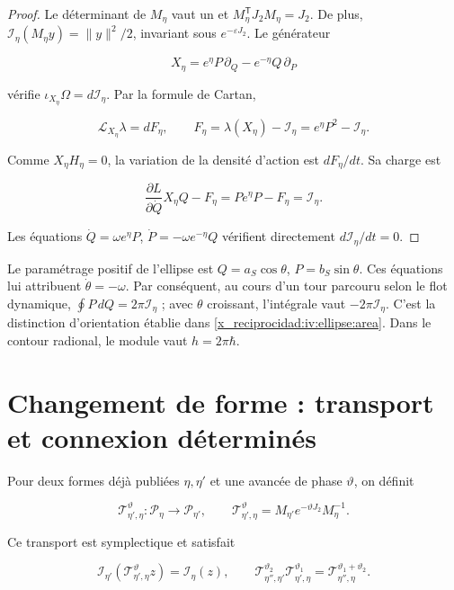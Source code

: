 \begin{proof}
Le déterminant de \(M_\eta\) vaut un et \(M_\eta^{\mathsf T}J_2M_\eta=J_2\). De plus,
\(\mathcal I_\eta(M_\eta y)=\|y\|^2/2\), invariant sous \(e^{-\varepsilon J_2}\).
Le générateur

\[
X_\eta=e^\eta P\,\partial_Q-e^{-\eta}Q\,\partial_P
\]

vérifie \(\iota_{X_\eta}\Omega=d\mathcal I_\eta\). Par la formule de Cartan,

\[
\mathcal L_{X_\eta}\lambda=dF_\eta,\qquad
F_\eta=\lambda(X_\eta)-\mathcal I_\eta=e^\eta P^2-\mathcal I_\eta.
\]

Comme \(X_\eta H_\eta=0\), la variation de la densité d’action est \(dF_\eta/dt\). Sa charge est

\[
\frac{\partial L}{\partial\dot Q}X_\eta Q-F_\eta
=Pe^\eta P-F_\eta=\mathcal I_\eta.
\]

Les équations \(\dot Q=\omega e^\eta P\), \(\dot P=-\omega e^{-\eta}Q\) vérifient directement \(d\mathcal I_\eta/dt=0\).
\end{proof}

Le paramétrage positif de l’ellipse est \(Q=a_S\cos\theta\), \(P=b_S\sin\theta\). Ces équations lui attribuent \(\dot\theta=-\omega\). Par conséquent, au cours d’un tour parcouru selon le flot dynamique, \(\oint P\,dQ=2\pi\mathcal I_\eta\) ; avec \(\theta\) croissant, l’intégrale vaut \(-2\pi\mathcal I_\eta\). C’est la distinction d’orientation établie dans \cref{x_reciprocidad:iv:ellipse:area}. Dans le contour radional, le module vaut \(h=2\pi\hbar\).

\section{Changement de forme : transport et connexion déterminés}

Pour deux formes déjà publiées \(\eta,\eta'\) et une avancée de phase \(\vartheta\), on définit

\begin{equation}
\mathcal T_{\eta',\eta}^{\vartheta}:\mathcal P_\eta\to\mathcal P_{\eta'},
\qquad
\mathcal T_{\eta',\eta}^{\vartheta}
=M_{\eta'}e^{-\vartheta J_2}M_\eta^{-1}.
\label{x_reciprocidad:nuc07:eq:4}
\end{equation}

\begin{proposition}
Ce transport est symplectique et satisfait

\begin{equation}
\mathcal I_{\eta'}(\mathcal T_{\eta',\eta}^{\vartheta}z)
=\mathcal I_\eta(z),\qquad
\mathcal T_{\eta'',\eta'}^{\vartheta_2}
\mathcal T_{\eta',\eta}^{\vartheta_1}
=\mathcal T_{\eta'',\eta}^{\vartheta_1+\vartheta_2}.
\label{x_reciprocidad:nuc07:eq:5}
\end{equation}
\end{proposition}

